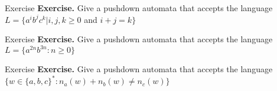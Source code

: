 \documentclass[10pt]{beamer}
\begin{document}
\begin{frame}[t]{Exercise}
    \textbf{Exercise.} Give a pushdown automata that accepts the language $L=\{a^ib^jc^k|i,j,k\geq 0$ and $i+j=k\}$
\end{frame}

\begin{frame}[t]{Exercise}
    \textbf{Exercise.} Give a pushdown automata that accepts the language $L=\{a^{2n}b^{3n} : n \geq 0 \}$
\end{frame}

\begin{frame}[t]{Exercise}
    \textbf{Exercise.} Give a pushdown automata that accepts the language $\{w \in \{a,b,c\}^* : n_a(w) + n_b(w) \neq n_c(w)\}$
\end{frame}
\end{document}
